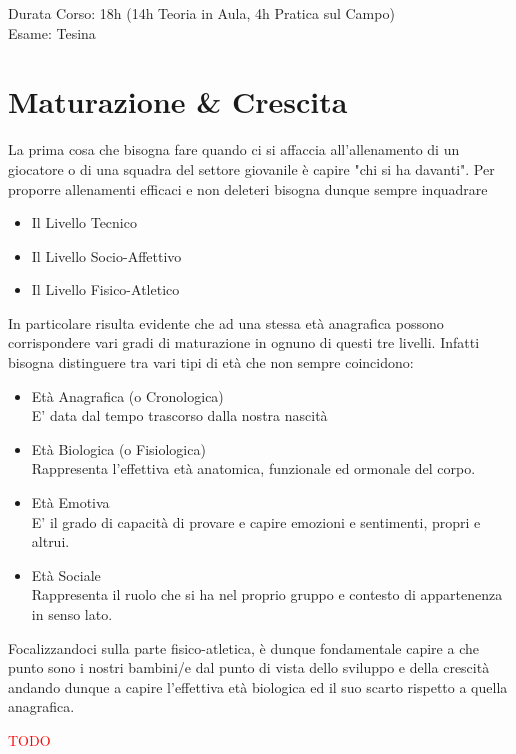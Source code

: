 \documentclass[../uefaC.tex]{subfiles}
\begin{document}

Durata Corso: 18h (14h Teoria in Aula, 4h Pratica sul Campo) \hfill \\
Esame: Tesina

\section{Maturazione \& Crescita}

La prima cosa che bisogna fare quando ci si affaccia all'allenamento di un giocatore o di una squadra del settore giovanile è capire "chi si ha davanti". Per proporre allenamenti efficaci e non deleteri bisogna dunque sempre inquadrare
\begin{itemize}
    \item{Il Livello Tecnico}
    \item{Il Livello Socio-Affettivo}
    \item{Il Livello Fisico-Atletico}
\end{itemize}

In particolare risulta evidente che ad una stessa età anagrafica possono corrispondere vari gradi di maturazione in ognuno di questi tre livelli. Infatti bisogna distinguere tra vari tipi di età che non sempre coincidono:
\begin{itemize}
    \item{Età Anagrafica (o Cronologica)}\hfill \\E' data dal tempo trascorso dalla nostra nascità
    \item{Età Biologica (o Fisiologica)}\hfill \\Rappresenta l'effettiva età anatomica, funzionale ed ormonale del corpo.
    \item{Età Emotiva}\hfill \\E' il grado di capacità di provare e capire emozioni e sentimenti, propri e altrui.
    \item{Età Sociale}\hfill \\Rappresenta il ruolo che si ha nel proprio gruppo e contesto di appartenenza in senso lato.
\end{itemize}

Focalizzandoci sulla parte fisico-atletica, è dunque fondamentale capire a che punto sono i nostri bambini/e dal punto di vista dello sviluppo e della crescità andando dunque a capire l'effettiva età biologica ed il suo scarto rispetto a quella anagrafica.

\textcolor{red}{TODO}
\end{document}
